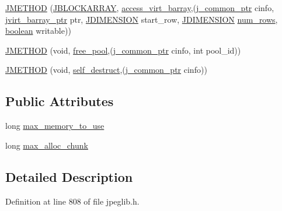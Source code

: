 \begin{DoxyCompactItemize}
\item 
\mbox{\hyperlink{structjpeg__memory__mgr_aa460f4b500825e051306b8ce5583d052}{J\+M\+E\+T\+H\+OD}} (\mbox{\hyperlink{jpeglib_8h_ab03cfeb937b60b9b73ca6e3cf935af49}{J\+B\+L\+O\+C\+K\+A\+R\+R\+AY}}, \mbox{\hyperlink{jmemmgr_8c_a44b7e7df5b22e5aeb267afbd9ee4f37b}{access\+\_\+virt\+\_\+barray}},(\mbox{\hyperlink{jpeglib_8h_a1a177ab705cefea8f30ec31a48e62650}{j\+\_\+common\+\_\+ptr}} cinfo, \mbox{\hyperlink{jpeglib_8h_a994f4cba141d82ded90af38e51223f0b}{jvirt\+\_\+barray\+\_\+ptr}} ptr, \mbox{\hyperlink{jmorecfg_8h_a04ed4674f6f1d0d50ec241531e38274f}{J\+D\+I\+M\+E\+N\+S\+I\+ON}} start\+\_\+row, \mbox{\hyperlink{jmorecfg_8h_a04ed4674f6f1d0d50ec241531e38274f}{J\+D\+I\+M\+E\+N\+S\+I\+ON}} \mbox{\hyperlink{jpegint_8h_ac5f8b57092da0f421713ba171c4c9f87}{num\+\_\+rows}}, \mbox{\hyperlink{jmorecfg_8h_a7c6368b321bd9acd0149b030bb8275ed}{boolean}} writable))
\item 
\mbox{\hyperlink{structjpeg__memory__mgr_a7e7e063767441999982d22c5cc0e9423}{J\+M\+E\+T\+H\+OD}} (void, \mbox{\hyperlink{jmemmgr_8c_aafb9808f8c2c22a4115b86a52bcd10fb}{free\+\_\+pool}},(\mbox{\hyperlink{jpeglib_8h_a1a177ab705cefea8f30ec31a48e62650}{j\+\_\+common\+\_\+ptr}} cinfo, int pool\+\_\+id))
\item 
\mbox{\hyperlink{structjpeg__memory__mgr_ae80ddea0ba4f845f91d3a30e350b5f44}{J\+M\+E\+T\+H\+OD}} (void, \mbox{\hyperlink{jmemmgr_8c_a089178751c0bf3ab81082fcf2a3fab5c}{self\+\_\+destruct}},(\mbox{\hyperlink{jpeglib_8h_a1a177ab705cefea8f30ec31a48e62650}{j\+\_\+common\+\_\+ptr}} cinfo))
\end{DoxyCompactItemize}
\subsection*{Public Attributes}
\begin{DoxyCompactItemize}
\item 
long \mbox{\hyperlink{structjpeg__memory__mgr_aa7ef7c0d7ffbfcbee837ae9cb8b12c7e}{max\+\_\+memory\+\_\+to\+\_\+use}}
\item 
long \mbox{\hyperlink{structjpeg__memory__mgr_a0301712c8796bb5555093d72b37c5a58}{max\+\_\+alloc\+\_\+chunk}}
\end{DoxyCompactItemize}


\subsection{Detailed Description}


Definition at line 808 of file jpeglib.\+h.



